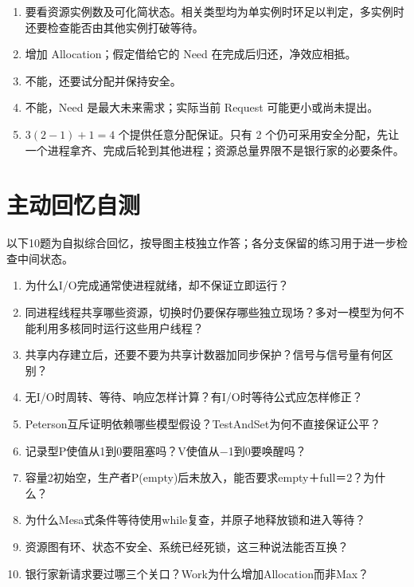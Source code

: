 \begin{enumerate}
\def\labelenumi{\arabic{enumi}.}
\tightlist
\item
  要看资源实例数及可化简状态。相关类型均为单实例时环足以判定，多实例时还要检查能否由其他实例打破等待。
\item
  增加 Allocation；假定借给它的 Need 在完成后归还，净效应相抵。
\item
  不能，还要试分配并保持安全。
\item
  不能，Need 是最大未来需求；实际当前 Request 可能更小或尚未提出。
\item
  \(3(2-1)+1=4\) 个提供任意分配保证。只有 2 个仍可采用安全分配，先让一个进程拿齐、完成后轮到其他进程；资源总量界限不是银行家的必要条件。
\end{enumerate}

\section{主动回忆自测}\label{OS02-recall}

以下10题为自拟综合回忆，按导图主枝独立作答；各分支保留的练习用于进一步检查中间状态。

\begin{recallcard}[从执行身份回忆到资源安全]

\begin{enumerate}
\def\labelenumi{\arabic{enumi}.}
\tightlist
\item
  为什么I/O完成通常使进程就绪，却不保证立即运行？
\item
  同进程线程共享哪些资源，切换时仍要保存哪些独立现场？多对一模型为何不能利用多核同时运行这些用户线程？
\item
  共享内存建立后，还要不要为共享计数器加同步保护？信号与信号量有何区别？
\item
  无I/O时周转、等待、响应怎样计算？有I/O时等待公式应怎样修正？
\item
  Peterson互斥证明依赖哪些模型假设？TestAndSet为何不直接保证公平？
\item
  记录型P使值从1到0要阻塞吗？V使值从\ensuremath{-}1到0要唤醒吗？
\item
  容量2初始空，生产者P(empty)后未放入，能否要求empty＋full＝2？为什么？
\item
  为什么Mesa式条件等待使用while复查，并原子地释放锁和进入等待？
\item
  资源图有环、状态不安全、系统已经死锁，这三种说法能否互换？
\item
  银行家新请求要过哪三个关口？Work为什么增加Allocation而非Max？
\end{enumerate}

\end{recallcard}

